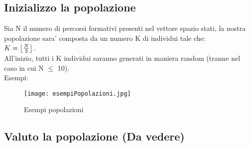 \documentclass[10pt,a4paper]{article}
\begin{document}
    \subsection{Inizializzo la popolazione}
      \label{inizializzoLaPopolazioneSubsection}
      Sia N il numero di percorsi formativi presenti nel vettore spazio stati, la nostra\\
      popolazione sara' composta da un numero K di individui tale che:\\ 
      $ K = \bigl\lfloor {N \over 3} \bigl\rfloor $.\\
      All'inizio, tutti i K individui saranno generati in maniera random (tranne nel caso in cui N $\leq$ 10).\\
      Esempi:
      \begin{figure}
        \centering
        \caption{Esempi popolazioni}
        \texttt{[image: esempiPopolazioni.jpg]}
        \label{esempiPopolazioni}
      \end{figure}
      
      \newpage
      
    \subsection{Valuto la popolazione (Da vedere)}
      \label{valutoLaPopolazioneSubsection}
      
\end{document}
